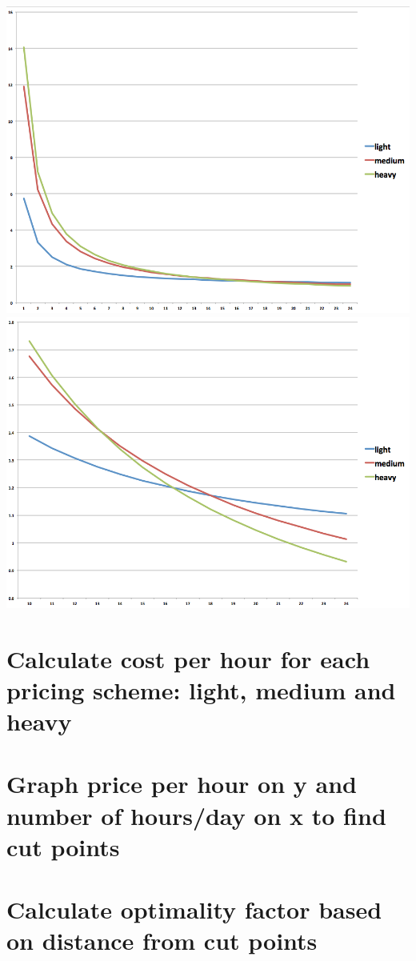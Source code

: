 \documentclass[]{final_report}
\begin{document}
\includegraphics[width=\linewidth]{cph}
\includegraphics[width=\linewidth]{cph_zoom}

\section{Calculate cost per hour for each pricing scheme: light, medium and heavy}

\section{Graph price per hour on y and number of hours/day on x to find cut points}

\section{Calculate optimality factor based on distance from cut points}
\end{document}
